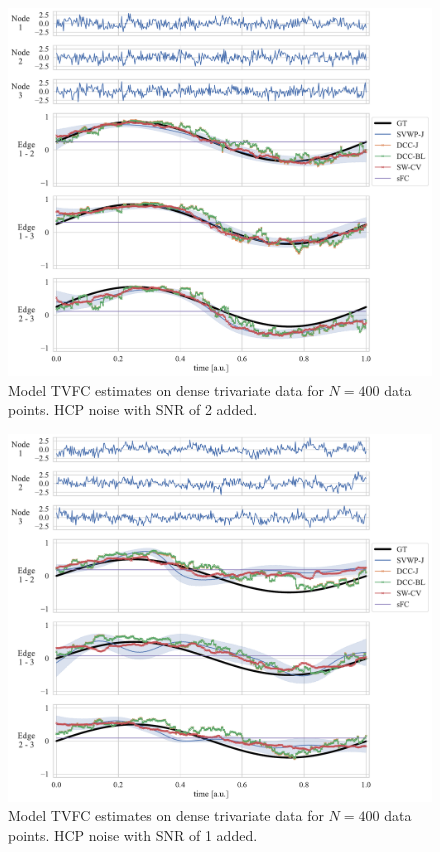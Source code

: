 \begin{figure}[h]
  \centering
  \includegraphics[width=\textwidth]{fig/sim/d3d/N0400_T0003/HCP_noise_snr_2/periodic_1_correlations}
  \caption{
    Model TVFC estimates on dense trivariate data for $N = 400$ data points.
    HCP noise with SNR of 2 added.
  }\label{fig:results-d3d-periodic-1-tvfc-predictions-snr-2}
\end{figure}


\begin{figure}[h]
  \centering
  \includegraphics[width=\textwidth]{fig/sim/d3d/N0400_T0003/HCP_noise_snr_1/periodic_1_correlations}
  \caption{
    Model TVFC estimates on dense trivariate data for $N = 400$ data points.
    HCP noise with SNR of 1 added.
  }\label{fig:results-d3d-periodic-1-tvfc-predictions-snr-1}
\end{figure}


